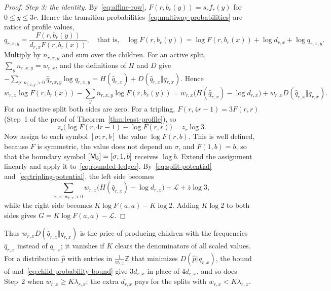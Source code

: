 \begin{proof}
\emph{Step 3: the identity.} By~\eqref{eq:affine-row},
\(F(r,b_r(y))=s_rf_r(y)\) for \(0\le y\le3r\). Hence the transition
probabilities~\eqref{eq:multiway-probabilities} are ratios of profile values,
\[
 q_{r,x,y}=\frac{F(r,b_r(y))}{d_{r,x}F(r,b_r(x))},
 \quad\text{that is,}\quad
 \log F(r,b_r(y))=\log F(r,b_r(x))+\log d_{r,x}+\log q_{r,x,y}.
\]
Multiply by \(n_{r,x,y}\) and sum over the children. For an active split,
\(\sum_yn_{r,x,y}=w_{r,x}\), and the definitions of \(H\) and \(D\) give
\(-\sum_{y:\,n_{r,x,y}>0}\hat q_{r,x,y}\log q_{r,x,y}
 =H(\hat q_{r,x})+D(\hat q_{r,x}\Vert q_{r,x})\). Hence
\begin{equation}\label{eq:split-potential}
 w_{r,x}\log F(r,b_r(x))-\sum_yn_{r,x,y}\log F(r,b_r(y))
 =w_{r,x}\bigl(H(\hat q_{r,x})-\log d_{r,x}\bigr)
  +w_{r,x}D(\hat q_{r,x}\Vert q_{r,x}).
\end{equation}
For an inactive split both sides are zero. For a tripling,
\(F(r,4r-1)=3F(r,r)\) (Step~1 of the proof of
Theorem~\ref{thm:least-profile}), so
\begin{equation}\label{eq:tripling-potential}
 z_r\bigl(\log F(r,4r-1)-\log F(r,r)\bigr)=z_r\log3.
\end{equation}
Now assign to each symbol \([\sigma;r,b]\) the value \(\log F(r,b)\). This
is well defined, because \(F\) is symmetric, the value does not depend on
\(\sigma\), and \(F(1,b)=b\), so that the boundary symbol
\([\mathsf M_b]=[\sigma;1,b]\) receives \(\log b\). Extend the assignment
linearly and apply it to~\eqref{eq:rounded-ledger}.
By~\eqref{eq:split-potential} and~\eqref{eq:tripling-potential}, the left
side becomes
\[
 \sum_{r,x:\,w_{r,x}>0}w_{r,x}\bigl(H(\hat q_{r,x})-\log d_{r,x}\bigr)
 +\mathcal L+\bar z\log3,
\]
while the right side becomes \(K\log F(a,a)-K\log2\). Adding \(K\log2\) to
both sides gives \(G=K\log F(a,a)-\mathcal L\).
\end{proof}

Thus \(w_{r,x}D(\hat q_{r,x}\Vert q_{r,x})\) is the price of producing
children with the frequencies \(\hat q_{r,x}\) instead of \(q_{r,x}\); it
vanishes if \(K\) clears the denominators of all scaled values. For a
distribution \(\hat p\) with entries in \(\frac1{w_{r,x}}\mathbb Z\) that
minimizes \(D(\hat p\Vert q_{r,x})\), the bound of \citet[Section~IV.D, Eq.~(42)]{BoechererGeiger16}
and~\eqref{eq:child-probability-bound} give \(3d_{r,x}\) in place of
\(4d_{r,x}\), and so does Step~2 when \(w_{r,x}\ge K\lambda_{r,x}\); the extra
\(d_{r,x}\) pays for the splits with \(w_{r,x}<K\lambda_{r,x}\).

